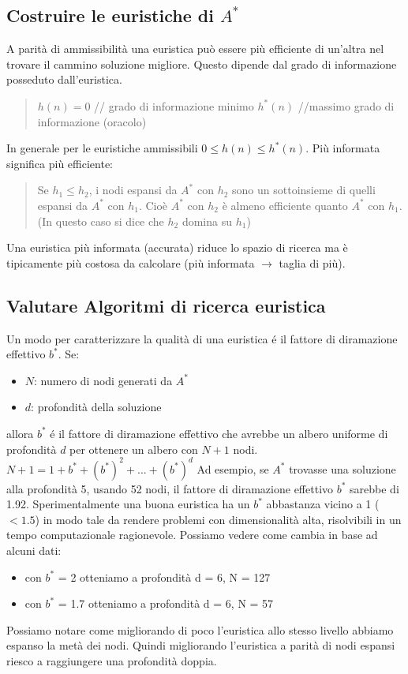 \documentclass{article}
\begin{document}
\subsection{Costruire le euristiche di $A^*$}
A parità di ammissibilità una euristica può essere più efficiente di un'altra nel trovare il cammino soluzione migliore. Questo dipende dal grado di informazione posseduto dall'euristica.
\begin{quote}
    $h(n) = 0$ // grado di informazione minimo \newline
    $h^*(n)$ //massimo grado di informazione (oracolo)
\end{quote}
In generale per le euristiche ammissibili $0 \leq h(n) \leq h^*(n)$. \newline
Più informata significa più efficiente:
\begin{quote}
    Se $h_1 \leq h_2$, i nodi espansi da $A^*$ con $h_2$ sono un sottoinsieme di quelli espansi da $A^*$ con $h_1$. Cioè $A^*$ con $h_2$ è almeno efficiente quanto $A^*$ con $h_1$. (In questo caso si dice che $h_2$ domina su $h_1$)
\end{quote}
Una euristica più informata (accurata) riduce lo spazio di ricerca ma è tipicamente più costosa da calcolare (più informata $\rightarrow$ taglia di più). 

\subsection{Valutare Algoritmi di ricerca euristica}
Un modo per caratterizzare la qualità di una euristica é il fattore di diramazione effettivo $b^*$. \newline
Se:
\begin{itemize}
    \item $N$: numero di nodi generati da $A^*$
    \item $d$: profondità della soluzione
\end{itemize}
allora $b^*$ é il fattore di diramazione effettivo che avrebbe un albero uniforme di profondità $d$ per ottenere un albero con $N+1$ nodi. \newline
$N+1 = 1 + b^* + (b^*)^2 + ... + (b^*)^d$ \newline
Ad esempio, se $A^*$ trovasse una soluzione alla profondità 5, usando 52 nodi, il fattore di diramazione effettivo $b^*$ sarebbe di 1.92. \newline
Sperimentalmente una buona euristica ha un $b^*$ abbastanza vicino a 1 ($< 1.5$) in modo tale da rendere problemi con dimensionalità alta, risolvibili in un tempo computazionale ragionevole.\newline
Possiamo vedere come cambia in base ad alcuni dati:
\begin{itemize}
    \item con $b^*$ = 2 otteniamo a profondità d = 6, N = 127
    \item con $b^*$ = 1.7 otteniamo a profondità d = 6, N = 57
\end{itemize}
Possiamo notare come migliorando di poco l'euristica allo stesso livello abbiamo espanso la metà dei nodi. Quindi migliorando l'euristica a parità di nodi espansi riesco a raggiungere una profondità doppia.
\clearpage
\end{document}
